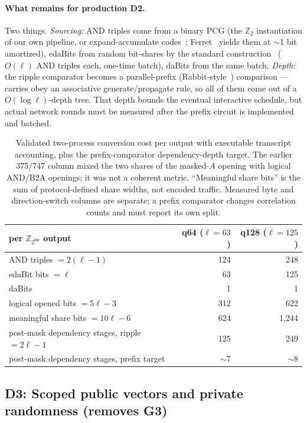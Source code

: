 \documentclass[11pt]{article}
\newcommand{\Z}{\mathbb{Z}}
\newcommand{\bw}{\mathsf{bw}}
\newcommand{\modtwo}{\Z_{2^{\bw}}}
\begin{document}
\paragraph{What remains for production D2.} Two things. \emph{Sourcing:} AND triples come
from a binary PCG (the $\Z_2$ instantiation of our own pipeline, or
expand-accumulate codes~\cite{couteau2021silver}; Ferret~\cite{yang2020ferret}
yields them at $\sim$1 bit amortized), edaBits from random bit-shares by the
standard construction~\cite{escudero2020edabits} ($O(\ell)$ AND triples each,
one-time batch), daBits from the same batch. \emph{Depth:} the ripple
comparator becomes a parallel-prefix (Rabbit-style~\cite{makri2021rabbit})
comparison --- carries obey an associative generate/propagate rule, so all of
them come out of a $O(\log\ell)$-depth tree. That depth bounds the eventual
interactive schedule, but actual network rounds must be measured after the
prefix circuit is implemented and batched.

\begin{table}[ht]
\centering
\small
\begin{tabular}{lrr}
\toprule
per $\modtwo$ output & q64 ($\ell{=}63$) & q128 ($\ell{=}125$)\\
\midrule
AND triples $=2(\ell{-}1)$ & 124 & 248\\
edaBit bits $=\ell$        & 63  & 125\\
daBits                     & 1   & 1\\
logical opened bits $=5\ell-3$ & 312 & 622\\
meaningful share bits $=10\ell-6$ & 624 & 1{,}244\\
post-mask dependency stages, ripple $=2\ell{-}1$ & 125 & 249\\
post-mask dependency stages, prefix target & $\sim$7 & $\sim$8\\
\bottomrule
\end{tabular}
\caption{Validated two-process conversion cost per output with executable
transcript accounting, plus the prefix-comparator dependency-depth target.
The earlier 375/747 column mixed the two shares of the masked-$A$ opening with
logical AND/B2A openings; it was not a coherent metric. ``Meaningful share
bits'' is the sum of protocol-defined share widths, not encoded traffic.
Measured byte and direction-switch columns are separate; a prefix comparator
changes correlation counts and must report its own split.}
\label{tab:convert}
\end{table}

\subsection{D3: Scoped public vectors and private randomness (removes G3)}
\label{sec:design-seeds}
\end{document}
